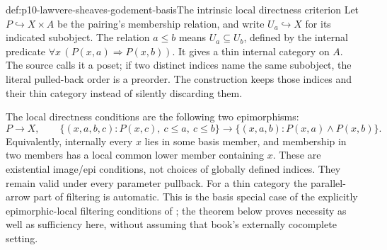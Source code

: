 \begin{hbdefinition}{def:p10-lawvere-sheaves-godement-basis}{The intrinsic local directness criterion}
Let \(P\hookrightarrow X\times A\) be the pairing's membership
relation, and write \(U_a\hookrightarrow X\) for its indicated
subobject.  The relation \(a\leq b\) means
\(U_a\subseteq U_b\), defined by the internal predicate
\(\forall x\,(P(x,a)\Rightarrow P(x,b))\).
It gives a thin internal category on \(A\).  The source calls
it a poset; if two distinct indices name the same subobject,
the literal pulled-back order is a preorder.  The construction
keeps those indices and their thin category instead of silently
discarding them.

The local directness conditions are the following two epimorphisms:
\[
 P\longrightarrow X,
 \qquad
 \{(x,a,b,c):P(x,c),\ c\leq a,\ c\leq b\}
      \longrightarrow\{(x,a,b):P(x,a)\land P(x,b)\}.
\]
Equivalently, internally every \(x\) lies in some basis member,
and membership in two members has a local common lower member
containing \(x\).  These are existential image/epi conditions,
not choices of globally defined indices.  They remain valid under
every parameter pullback.  For a thin category the parallel-arrow
part of filtering is automatic.  This is the basis special case
of the explicitly epimorphic-local filtering conditions of
\cite[VII\S8, Definition~1 and Lemma~3, pp.~394--397]
{MacLaneMoerdijk1992}; the theorem below proves necessity as well
as sufficiency here, without assuming that book's externally
cocomplete setting.
\end{hbdefinition}

